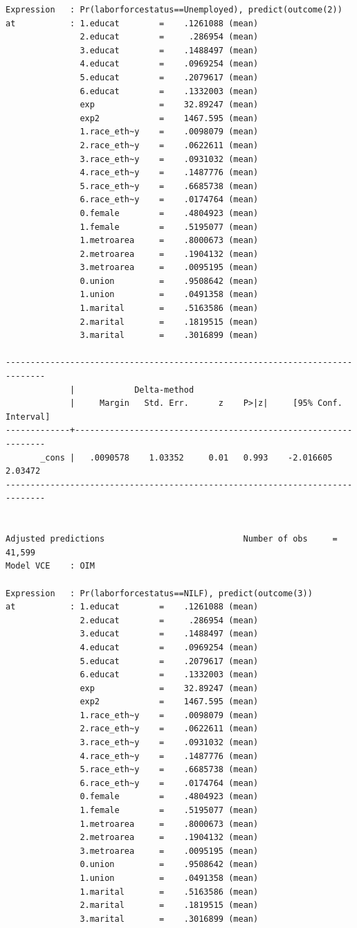 \documentclass[
]{book}
\begin{document}
\begin{verbatim}
Expression   : Pr(laborforcestatus==Unemployed), predict(outcome(2))
at           : 1.educat        =    .1261088 (mean)
               2.educat        =     .286954 (mean)
               3.educat        =    .1488497 (mean)
               4.educat        =    .0969254 (mean)
               5.educat        =    .2079617 (mean)
               6.educat        =    .1332003 (mean)
               exp             =    32.89247 (mean)
               exp2            =    1467.595 (mean)
               1.race_eth~y    =    .0098079 (mean)
               2.race_eth~y    =    .0622611 (mean)
               3.race_eth~y    =    .0931032 (mean)
               4.race_eth~y    =    .1487776 (mean)
               5.race_eth~y    =    .6685738 (mean)
               6.race_eth~y    =    .0174764 (mean)
               0.female        =    .4804923 (mean)
               1.female        =    .5195077 (mean)
               1.metroarea     =    .8000673 (mean)
               2.metroarea     =    .1904132 (mean)
               3.metroarea     =    .0095195 (mean)
               0.union         =    .9508642 (mean)
               1.union         =    .0491358 (mean)
               1.marital       =    .5163586 (mean)
               2.marital       =    .1819515 (mean)
               3.marital       =    .3016899 (mean)

------------------------------------------------------------------------------
             |            Delta-method
             |     Margin   Std. Err.      z    P>|z|     [95% Conf. Interval]
-------------+----------------------------------------------------------------
       _cons |   .0090578    1.03352     0.01   0.993    -2.016605     2.03472
------------------------------------------------------------------------------


Adjusted predictions                            Number of obs     =     41,599
Model VCE    : OIM

Expression   : Pr(laborforcestatus==NILF), predict(outcome(3))
at           : 1.educat        =    .1261088 (mean)
               2.educat        =     .286954 (mean)
               3.educat        =    .1488497 (mean)
               4.educat        =    .0969254 (mean)
               5.educat        =    .2079617 (mean)
               6.educat        =    .1332003 (mean)
               exp             =    32.89247 (mean)
               exp2            =    1467.595 (mean)
               1.race_eth~y    =    .0098079 (mean)
               2.race_eth~y    =    .0622611 (mean)
               3.race_eth~y    =    .0931032 (mean)
               4.race_eth~y    =    .1487776 (mean)
               5.race_eth~y    =    .6685738 (mean)
               6.race_eth~y    =    .0174764 (mean)
               0.female        =    .4804923 (mean)
               1.female        =    .5195077 (mean)
               1.metroarea     =    .8000673 (mean)
               2.metroarea     =    .1904132 (mean)
               3.metroarea     =    .0095195 (mean)
               0.union         =    .9508642 (mean)
               1.union         =    .0491358 (mean)
               1.marital       =    .5163586 (mean)
               2.marital       =    .1819515 (mean)
               3.marital       =    .3016899 (mean)


\end{verbatim}
\end{document}
